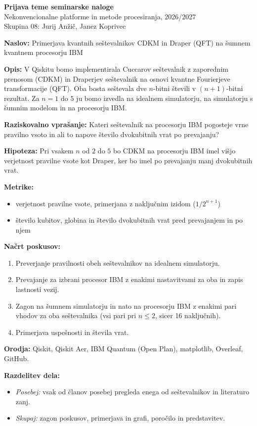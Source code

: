 \documentclass[11pt,a4paper]{article}
\newcommand{\polje}[1]{\textbf{#1}}
\begin{document}
{\large\textbf{Prijava teme seminarske naloge}}\\[0.2em]
Nekonvencionalne platforme in metode procesiranja, 2026/2027\\
Skupina 08: Jurij Anžič, Janez Koprivec

\vspace{0.6em}

\polje{Naslov:} Primerjava kvantnih seštevalnikov CDKM in Draper (QFT) na šumnem
kvantnem procesorju IBM

\polje{Opis:} V Qiskitu bomo implementirala Cuccarov seštevalnik z zaporednim
prenosom (CDKM) in Draperjev seštevalnik na osnovi kvantne Fourierjeve
transformacije (QFT). Oba bosta seštevala dve $n$-bitni števili v
$(n{+}1)$-bitni rezultat. Za $n = 1$ do $5$ ju bomo izvedla na idealnem
simulatorju, na simulatorju s šumnim modelom in na procesorju IBM.

\polje{Raziskovalno vprašanje:} Kateri seštevalnik na procesorju IBM pogosteje
vrne pravilno vsoto in ali to napove število dvokubitnih vrat po prevajanju?

\polje{Hipoteza:} Pri vsakem $n$ od $2$ do $5$ bo CDKM na procesorju IBM imel
višjo verjetnost pravilne vsote kot Draper, ker bo imel po prevajanju manj
dvokubitnih vrat.

\polje{Metrike:}
\begin{itemize}
  \item verjetnost pravilne vsote, primerjana z naključnim izidom ($1/2^{n+1}$)
  \item število kubitov, globina in število dvokubitnih vrat pred prevajanjem in po njem
\end{itemize}

\polje{Načrt poskusov:}
\begin{enumerate}
  \item Preverjanje pravilnosti obeh seštevalnikov na idealnem simulatorju.
  \item Prevajanje za izbrani procesor IBM z enakimi nastavitvami za oba in
        zapis lastnosti vezij.
  \item Zagon na šumnem simulatorju in nato na procesorju IBM z enakimi pari
        vhodov za oba seštevalnika (vsi pari pri $n \le 2$, sicer 16 naključnih).
  \item Primerjava uspešnosti in števila vrat.
\end{enumerate}

\polje{Orodja:} Qiskit, Qiskit Aer, IBM Quantum (Open Plan), matplotlib,
Overleaf, GitHub.

\polje{Razdelitev dela:}
\begin{itemize}
  \item \emph{Posebej:} vsak od članov posebej pregleda enega od seštevalnikov
        in literaturo zanj.
  \item \emph{Skupaj:} zagon poskusov, primerjava in grafi, poročilo in predstavitev.
\end{itemize}
\end{document}
